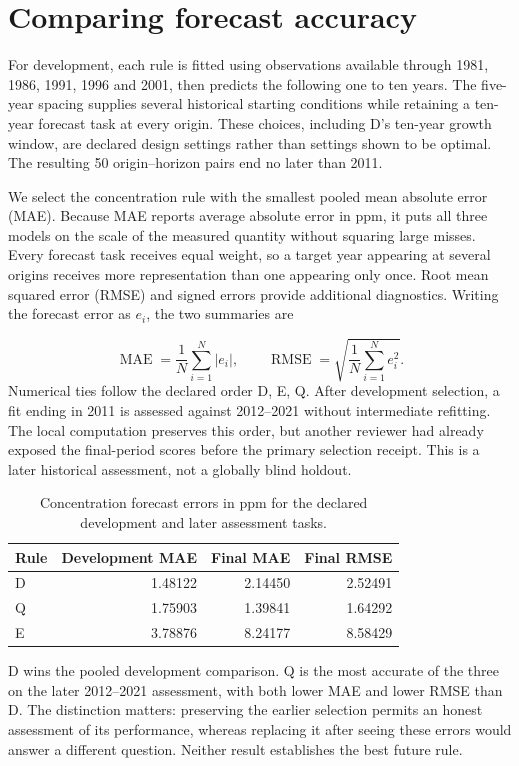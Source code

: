 \documentclass[11pt,a4paper]{article}
\newcommand{\p}[2]{#2\par}
\newcommand{\txt}[2]{#2}
\begin{document}
\section{Comparing forecast accuracy}\label{sec:validation}
\p{VAL01}{For development, each rule is fitted using observations available through 1981, 1986, 1991, 1996 and 2001, then predicts the following one to ten years. The five-year spacing supplies several historical starting conditions while retaining a ten-year forecast task at every origin. These choices, including D's ten-year growth window, are declared design settings rather than settings shown to be optimal. The resulting 50 origin--horizon pairs end no later than 2011.}
\p{VAL02}{We select the concentration rule with the smallest pooled mean absolute error (MAE). Because MAE reports average absolute error in ppm, it puts all three models on the scale of the measured quantity without squaring large misses. Every forecast task receives equal weight, so a target year appearing at several origins receives more representation than one appearing only once. Root mean squared error (RMSE) and signed errors provide additional diagnostics. Writing the forecast error as $e_i$, the two summaries are}
\begin{equation}\label{eq:errors}
\operatorname{MAE}=\frac{1}{N}\sum_{i=1}^{N}|e_i|,\qquad
\operatorname{RMSE}=\sqrt{\frac{1}{N}\sum_{i=1}^{N}e_i^2}.
\end{equation}
\p{VAL03}{Numerical ties follow the declared order D, E, Q. After development selection, a fit ending in 2011 is assessed against 2012--2021 without intermediate refitting. The local computation preserves this order, but another reviewer had already exposed the final-period scores before the primary selection receipt. This is a later historical assessment, not a globally blind holdout.}
\begin{table}[H]\centering\small
\caption{\txt{TC04}{Concentration forecast errors in ppm for the declared development and later assessment tasks.}}\label{tab:co2-errors}
\begin{tabular}{lrrr}\toprule
Rule & Development MAE & Final MAE & Final RMSE\\\midrule
D & 1.48122 & 2.14450 & 2.52491\\
Q & 1.75903 & 1.39841 & 1.64292\\
E & 3.78876 & 8.24177 & 8.58429\\\bottomrule
\end{tabular}
\end{table}
\p{VAL04}{D wins the pooled development comparison. Q is the most accurate of the three on the later 2012--2021 assessment, with both lower MAE and lower RMSE than D. The distinction matters: preserving the earlier selection permits an honest assessment of its performance, whereas replacing it after seeing these errors would answer a different question. Neither result establishes the best future rule.}
\end{document}
